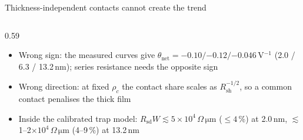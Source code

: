 \begin{frame}[t]{Thickness-independent contacts cannot create the trend}
\begin{columns}[T,onlytextwidth]
\begin{column}{0.59\textwidth}
\begin{itemize}
          times the contact resistance of related metal/\InO{} contacts, below 0.1\,$\Omega$\,mm
        \item Wrong sign: the measured curves give $\theta_\mathrm{net} = -0.10/{-0.12}/{-0.046}$\,V$^{-1}$
          (2.0 / 6.3 / 13.2\,nm); series resistance needs the opposite sign 
        \item Wrong direction: at fixed $\rho_c$ the contact share scales as $R_\mathrm{sh}^{-1/2}$, so a common
          contact penalises the thick film 
        \item Inside the calibrated trap model: $R_\mathrm{sd}W \lesssim 5\times10^{4}\,\Omega\,\si{\micro\metre}$
          ($\le 4$\,\%) at 2.0\,nm, $\lesssim$ 1--2$\times10^{4}\,\Omega\,\si{\micro\metre}$ (4--9\,\%) at
          13.2\,nm 
      \end{itemize}
    \end{column}
  \end{columns}
\end{frame}

